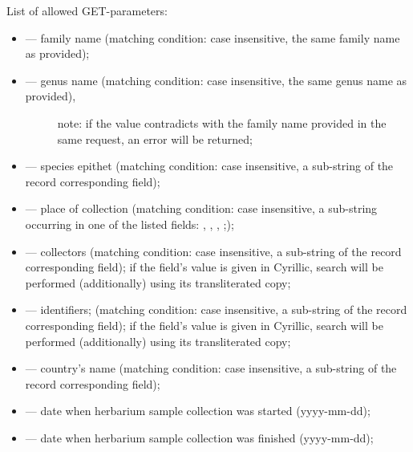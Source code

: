 \documentclass[letterpaper,10pt,english]{sphinxmanual}
\begin{document}
List of allowed GET-parameters:
\begin{itemize}
\item {} 
 — family name (matching condition: case insensitive, the same family name as provided);

\item {} \begin{description}
\item[{ —  genus name (matching condition:  case insensitive, the same genus name as provided),}] \leavevmode
note: if the value contradicts with the family name provided in the same request,
an error will be returned;

\end{description}

\item {} 
 — species epithet (matching condition:
case insensitive, a sub-string of the record corresponding field);

\item {} 
 —  place of collection (matching condition: case insensitive,
a sub-string occurring in one of the listed fields: , , , ;);

\item {} 
 — collectors (matching condition: case insensitive, a sub-string of the record corresponding field);
if the field’s value is given in Cyrillic, search will be performed (additionally) using its transliterated copy;

\item {} 
 — identifiers; (matching condition: case insensitive, a sub-string of the record corresponding field);
if the field’s value is given in Cyrillic, search will be performed (additionally) using its transliterated copy;

\item {} 
 — country’s name (matching condition: case insensitive, a sub-string of the record corresponding field);

\item {} 
 — date when herbarium sample collection was started (yyyy-mm-dd);

\item {} 
 —  date when herbarium sample collection was finished (yyyy-mm-dd);


\end{itemize}
\end{document}
